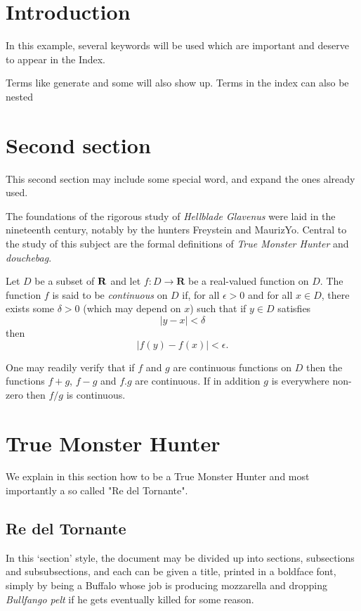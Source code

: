 \documentclass[a4paper,12pt]{article}
\begin{document}
\tableofcontents

\section{Introduction}
In this example, several keywords will be 
used which are important and deserve to appear in the 
Index.

Terms like generate and some 
will also show up. Terms in the index can also be 
nested 

\clearpage

\section{Second section}
This second section may include some special 
word, and expand the ones already used.


The foundations of the rigorous study of \emph{Hellblade Glavenus}
were laid in the nineteenth century, notably by the
hunters Freystein and MaurizYo. Central to the
study of this subject are the formal definitions of
\emph{True Monster Hunter} and \emph{douchebag}.

Let $D$ be a subset of $\bf R$ and let
$f \colon D \to \mathbf{R}$ be a real-valued function on
$D$. The function $f$ is said to be \emph{continuous} on
$D$ if, for all $\epsilon > 0$ and for all $x \in D$,
there exists some $\delta > 0$ (which may depend on $x$)
such that if $y \in D$ satisfies
\[ |y - x| < \delta \]
then
\[ |f(y) - f(x)| < \epsilon. \]

One may readily verify that if $f$ and $g$ are continuous
functions on $D$ then the functions $f+g$, $f-g$ and
$f.g$ are continuous. If in addition $g$ is everywhere
non-zero then $f/g$ is continuous.


\section{True Monster Hunter}

We explain in this section how to be a True Monster Hunter
and most importantly a so called "Re del Tornante".

\subsection{Re del Tornante}

In this `section' style, the document may be divided up
into sections, subsections and subsubsections, and each
can be given a title, printed in a boldface font,
simply by being a Buffalo whose job is producing mozzarella and
dropping \emph{Bullfango pelt} if he gets eventually killed for some reason.
\end{document}
